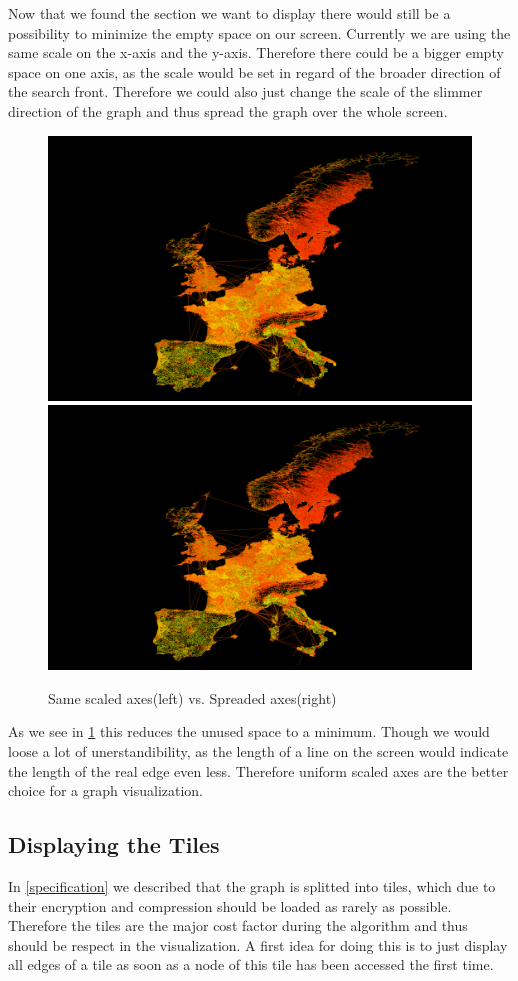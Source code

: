\documentclass
[
	paper = a4,
    pagesize,
	12 pt,
	oneside,                       %
    open = right,
	DIV = calc,
	BCOR = 0 mm,                   %
	bibtotoc
]
{scrbook}
\begin{document}
Now that we found the section we want to display there would still be a possibility to minimize the empty space on our screen.
Currently we are using the same scale on the x-axis and the y-axis.
Therefore there could be a bigger empty space on one axis, as the scale would be set in regard of the broader direction of the search front.
Therefore we could also just change the scale of the slimmer direction of the graph and thus spread the graph over the whole screen.

\begin{figure}[H]
	\includegraphics[width=.5\textwidth]{Images/placeholder.png}
	\includegraphics[width=.5\textwidth]{Images/placeholder.png}
\caption[]{Same scaled axes(left) vs. Spreaded axes(right)}
\label{fig:spreaded_axis}
\end{figure}

As we see in \cref{fig:spreaded_axis} this reduces the unused space to a minimum.
Though we would loose a lot of unerstandibility, as the length of a line on the screen would indicate the length of the real edge even less.
Therefore uniform scaled axes are the better choice for a graph visualization.


\subsection{Displaying the Tiles} \label{tiles}

In \cref{specification} we described that the graph is splitted into tiles, which due to their encryption and compression should be loaded as rarely as possible.
Therefore the tiles are the major cost factor during the algorithm and thus should be respect in the visualization.
A first idea for doing this is to just display all edges of a tile as soon as a node of this tile has been accessed the first time.
\end{document}
